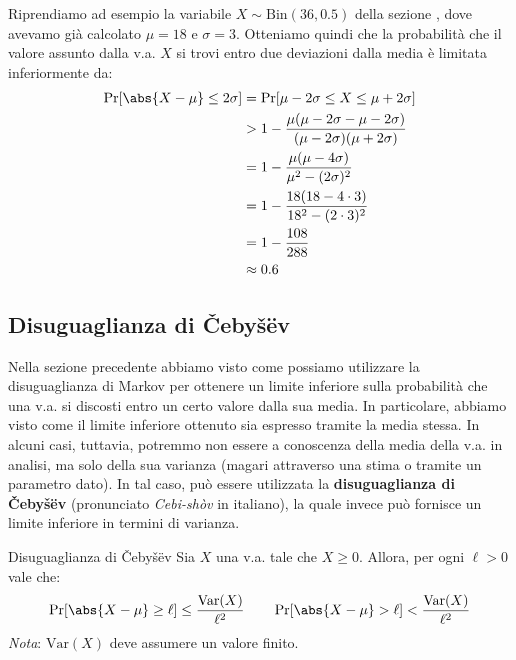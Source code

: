 \documentclass[a4paper, 12pt]{report}
\begin{document}
    Riprendiamo ad esempio la variabile $X \sim \mathrm{Bin}(36, 0.5)$ della sezione , dove avevamo già calcolato $\mu = 18$ e $\sigma = 3$. Otteniamo quindi che la probabilità che il valore assunto dalla v.a. $X$ si trovi entro due deviazioni dalla media è limitata inferiormente da:
    \[\begin{split}
        \Pr[\abs{X - \mu} \leq 2\sigma] &= \Pr[\mu - 2\sigma \leq X \leq \mu + 2\sigma] \\
        &> 1- \frac{\mu(\mu-2\sigma - \mu - 2\sigma)}{(\mu - 2\sigma)(\mu + 2\sigma)} \\
        &= 1- \frac{\mu(\mu - 4\sigma)}{\mu^2-(2\sigma)^2} \\
        &= 1- \frac{18 (18 - 4 \cdot 3)}{18^2 - (2 \cdot 3)^2} \\
        &= 1- \frac{108}{288} \\
        &\approx 0.6
    \end{split} \]
        
    \subsection{Disuguaglianza di Čebyšëv}

    Nella sezione precedente abbiamo visto come possiamo utilizzare la disuguaglianza di Markov per ottenere un limite inferiore sulla probabilità che una v.a. si discosti entro un certo valore dalla sua media. In particolare, abbiamo visto come il limite inferiore ottenuto sia espresso tramite la media stessa. In alcuni casi, tuttavia, potremmo non essere a conoscenza della media della v.a. in analisi, ma solo della sua varianza (magari attraverso una stima o tramite un parametro dato). In tal caso, può essere utilizzata la \textbf{disuguaglianza di Čebyšëv} (pronunciato \textit{Cebi-shòv} in italiano), la quale invece può fornisce un limite inferiore in termini di varianza.

    \begin{framedthm}{Disuguaglianza di Čebyšëv}
        Sia $X$ una v.a. tale che $X \geq 0$. Allora, per ogni $\ell > 0$ vale che:
        \[\Pr[\abs{X-\mu} \geq \ell] \leq \frac{\mathrm{Var}(X)}{\ell^2} \qquad \Pr[\abs{X-\mu} > \ell] < \frac{\mathrm{Var}(X)}{\ell^2}\]
        \textit{Nota}: $\mathrm{Var}(X)$ deve assumere un valore finito. 
    \end{framedthm}
\end{document}
